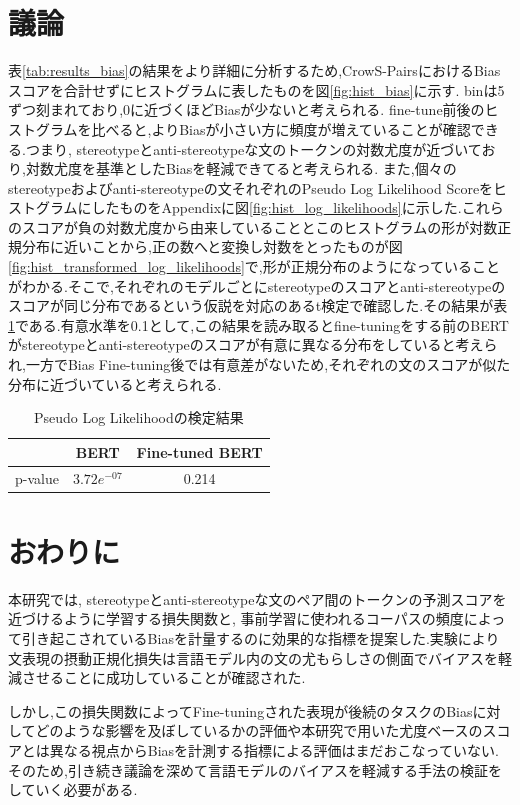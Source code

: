 \documentclass[
  platex, dvipdfmx %
]{nlp2021}
\begin{document}
\section{議論}
表\ref{tab:results_bias}の結果をより詳細に分析するため,CrowS-PairsにおけるBiasスコアを合計せずにヒストグラムに表したものを図\ref{fig:hist_bias}に示す. binは5ずつ刻まれており,0に近づくほどBiasが少ないと考えられる. fine-tune前後のヒストグラムを比べると,よりBiasが小さい方に頻度が増えていることが確認できる.つまり, stereotypeとanti-stereotypeな文のトークンの対数尤度が近づいており,対数尤度を基準としたBiasを軽減できてると考えられる.
また,個々のstereotypeおよびanti-stereotypeの文それぞれのPseudo Log Likelihood ScoreをヒストグラムにしたものをAppendixに図\ref{fig:hist_log_likelihoods}に示した.これらのスコアが負の対数尤度から由来していることとこのヒストグラムの形が対数正規分布に近いことから,正の数へと変換し対数をとったものが図\ref{fig:hist_transformed_log_likelihoods}で,形が正規分布のようになっていることがわかる.そこで,それぞれのモデルごとにstereotypeのスコアとanti-stereotypeのスコアが同じ分布であるという仮説を対応のあるt検定で確認した.その結果が表\ref{tab:t_bias_scores}である.有意水準を0.1として,この結果を読み取るとfine-tuningをする前のBERTがstereotypeとanti-stereotypeのスコアが有意に異なる分布をしていると考えられ,一方でBias Fine-tuning後では有意差がないため,それぞれの文のスコアが似た分布に近づいていると考えられる.

\begin{table}[h]
\centering
\caption{Pseudo Log Likelihoodの検定結果}
\label{tab:t_bias_scores}
\begin{tabular}{lcc}
\hline
 &  BERT & Fine-tuned BERT \\
\hline
p-value & $3.72e^{-07}$ &  0.214 \\
\hline
\end{tabular}
\end{table}

\section{おわりに}
本研究では, stereotypeとanti-stereotypeな文のペア間のトークンの予測スコアを近づけるように学習する損失関数と, 事前学習に使われるコーパスの頻度によって引き起こされているBiasを計量するのに効果的な指標を提案した.実験により文表現の摂動正規化損失は言語モデル内の文の尤もらしさの側面でバイアスを軽減させることに成功していることが確認された.

しかし,この損失関数によってFine-tuningされた表現が後続のタスクのBiasに対してどのような影響を及ぼしているかの評価や本研究で用いた尤度ベースのスコアとは異なる視点からBiasを計測する指標による評価はまだおこなっていない.そのため,引き続き議論を深めて言語モデルのバイアスを軽減する手法の検証をしていく必要がある.
\end{document}
